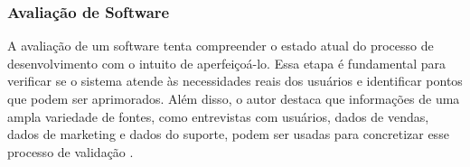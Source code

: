 \subsubsection{Avaliação de Software}

A avaliação de um software tenta compreender o estado atual do processo de desenvolvimento com o intuito de aperfeiçoá-lo. Essa etapa é fundamental para verificar se o sistema atende às necessidades reais dos usuários e identificar pontos que podem ser aprimorados. Além disso, o autor destaca que informações de uma ampla variedade de fontes, como entrevistas com usuários, dados de vendas, dados de marketing e dados do suporte, podem ser usadas para concretizar esse processo de validação \cite{pressman2016engenharia}.